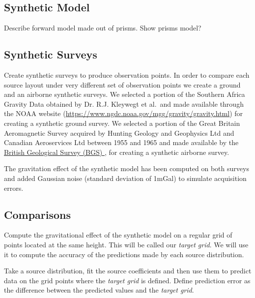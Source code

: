 \documentclass[twocolumn]{article}
\begin{document}
\subsection{Synthetic Model}

Describe forward model made out of prisms.
Show prisms model?

\subsection{Synthetic Surveys}

Create synthetic surveys to produce observation points.
In order to compare each source layout under very different set of observation
points we create a ground and an airborne synthetic surveys.
We selected a portion of the Southern Africa Gravity Data obtained by Dr. R.J.
Kleywegt et al.\ and made available through the NOAA website
(\url{https://www.ngdc.noaa.gov/mgg/gravity/gravity.html}) for creating
a synthetic ground survey.
We selected a portion of the Great Britain Aeromagnetic Survey acquired by
Hunting Geology and Geophysics Ltd and Canadian Aeroservices Ltd between 1955
and 1965 and made available by the
\href{
    https://www.bgs.ac.uk/products/geophysics/aeromagneticRegional.html
    }{
    British Geological Survey (BGS)
}
, for creating a synthetic airborne survey.

The gravitation effect of the synthetic model has been computed on both surveys
and added Gaussian noise (standard deviation of 1mGal) to simulate acquisition
errors.

\subsection{Comparisons}


Compute the gravitational effect of the synthetic model on a regular grid of
points located at the same height.
This will be called our \emph{target grid}.
We will use it to compute the accuracy of the predictions made by each source
distribution.

Take a source distribution, fit the source coefficients and then use them to
predict data on the grid points where the \emph{target grid} is defined.
Define prediction error as the difference between the predicted values and the
\emph{target grid}.
\end{document}
